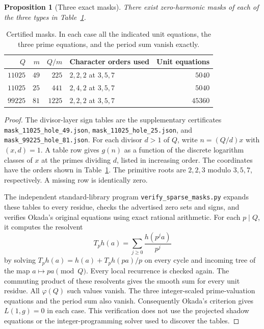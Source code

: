 \documentclass[11pt]{amsart}
\newtheorem{proposition}[theorem]{Proposition}
\theoremstyle{definition}
\theoremstyle{remark}
\numberwithin{equation}{section}
\begin{document}
\begin{proposition}[Three exact masks]
\label{prop:three-masks}
There exist zero-harmonic masks of each of the three types in
Table~\ref{tab:sparse-masks}.
\end{proposition}

\begin{table}[ht]
\centering
\begin{tabular}{r r r l r}
\hline
$Q$ & $m$ & $Q/m$ & Character orders used & Unit equations \\
\hline
$11025$ & $49$ & $225$ & $2,2,2$ at $3,5,7$ & $5040$ \\
$11025$ & $25$ & $441$ & $2,4,2$ at $3,5,7$ & $5040$ \\
$99225$ & $81$ & $1225$ & $2,2,2$ at $3,5,7$ & $45360$ \\
\hline
\end{tabular}
\caption{Certified masks. In each case all the indicated unit equations,
the three prime equations, and the period sum vanish exactly.}
\label{tab:sparse-masks}
\end{table}

\begin{proof}
The divisor-layer sign tables are the supplementary certificates
\texttt{mask\_11025\_hole\_49.json},
\texttt{mask\_11025\_hole\_25.json}, and
\texttt{mask\_99225\_hole\_81.json}.
For each divisor $d>1$ of $Q$, write
$n=(Q/d)x$ with $(x,d)=1$. A table row gives $g(n)$ as a function of the
discrete logarithm classes of $x$ at the primes dividing $d$, listed in
increasing order. The coordinates have the orders shown in
Table~\ref{tab:sparse-masks}. The primitive roots are $2,2,3$ modulo
$3,5,7$, respectively. A missing row is identically zero.

The independent standard-library program
\texttt{verify\_sparse\_masks.py} expands these tables to every residue,
checks the advertised zero sets and signs, and verifies Okada's original
equations using exact rational arithmetic. For each $p\mid Q$, it computes
the resolvent
\[
 T_p h(a)=\sum_{j\ge0}\frac{h(p^j a)}{p^j}
\]
by solving $T_p h(a)=h(a)+T_p h(pa)/p$ on every cycle and incoming tree of
the map $a\mapsto pa\pmod Q$. Every local recurrence is checked again.
The commuting product of these resolvents gives the smooth sum for every
unit residue. All $\varphi(Q)$ such values vanish. The three integer-scaled
prime-valuation equations and the period sum also vanish. Consequently
Okada's criterion gives $L(1,g)=0$ in each case. This verification does not
use the projected shadow equations or the integer-programming solver used
to discover the tables.
\end{proof}
\end{document}
